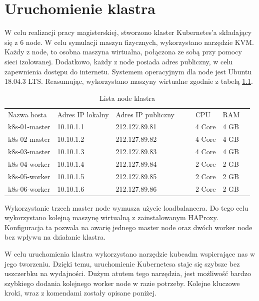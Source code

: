 \documentclass[pl,final,oneside]{mgr} %
\begin{document}
\chapter{Uruchomienie klastra}
W celu realizacji pracy magisterskiej, stworzono klaster Kubernetes’a składający się z 6 node. W celu symulacji maszyn fizycznych, wykorzystano narzędzie KVM. Każdy z node, to osobna maszyna wirtualna,  połączona ze sobą przy pomocy sieci izolowanej. Dodatkowo, każdy z node posiada adres publiczny, w celu zapewnienia dostępu do internetu. Systemem operacyjnym dla node jest Ubuntu 18.04.3 LTS. Reasumując, wykorzystano maszyny wirtualne zgodnie z tabelą \ref{tab:kvm_node}.

\begin{table}[h!]
	\begin{tabular}{llllllll}
		Nazwa hosta   & Adres IP lokalny & Adres IP publiczny &  &  & CPU    & RAM  &  \\
		k8s-01-master & 10.10.1.1        & 212.127.89.81     &  &  & 4 Core & 4 GB &  \\
		k8s-02-master & 10.10.1.2        & 212.127.89.82     &  &  & 4 Core & 4 GB &  \\
		k8s-03-master & 10.10.1.3        & 212.127.89.83     &  &  & 4 Core & 4 GB &  \\
		k8s-04-worker & 10.10.1.4        & 212.127.89.84     &  &  & 2 Core & 2 GB &  \\
		k8s-05-worker & 10.10.1.5        & 212.127.89.85     &  &  & 2 Core & 2 GB &  \\
		k8s-06-worker & 10.10.1.6        & 212.127.89.86     &  &  & 2 Core & 2 GB &  
	\end{tabular}
	\label{tab:kvm_node}
	\caption{Lista node klastra}
\end{table}
Wykorzystanie trzech master node wymusza użycie loadbalancera. Do tego celu wykorzystano kolejną maszynę wirtualną z zainstalowanym HAProxy. Konfiguracja ta pozwala na awarię jednego master node oraz dwóch worker node bez wpływu na działanie klastra.

W celu uruchomienia klastra wykorzystano narzędzie kubeadm wspierające nas w jego tworzeniu. Dzięki temu, uruchomienie Kubernetesa staje się szybsze bez uszczerbku na wydajności. Dużym atutem tego narzędzia, jest możliwość bardzo szybkiego dodania kolejnego worker node w razie potrzeby. Kolejne kluczowe kroki, wraz z komendami zostały opisane poniżej.
\end{document}
